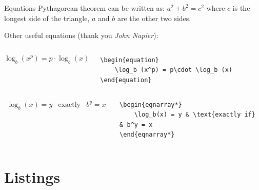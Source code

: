 \documentclass[aspectratio=1610]{beamer}
\begin{document}
\begin{frame}[fragile]{Equations}
    Pythagorean theorem can be written as: $a^2 + b^2 = c^2$ where $c$ is the longest side of the triangle, $a$ and $b$ are the other two sides.
    \bigskip

    Other useful equations (thank you \textit{John Napier}):
    \begin{columns}
        \begin{equation}
            \log_b (x^p) = p\cdot \log_b (x)
        \end{equation}

        \lstset{language=[LaTeX]TeX}
\begin{lstlisting}
\begin{equation}
    \log_b (x^p) = p\cdot \log_b (x)
\end{equation}
\end{lstlisting}
    \end{columns}

    \begin{columns}
        \begin{eqnarray*}
            \log_b(x) = y & \text{exactly if} & b^y = x
        \end{eqnarray*}

        \lstset{language=[LaTeX]TeX}
\begin{lstlisting}
\begin{eqnarray*}
    \log_b(x) = y & \text{exactly if} & b^y = x
\end{eqnarray*}
\end{lstlisting}
    \end{columns}
    \note{~}
\end{frame}



\section{Listings}
\end{document}
